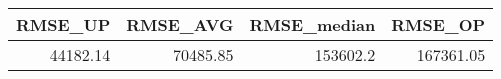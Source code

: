 \begin{tabular}{rrrr}
\toprule
 RMSE\_UP &  RMSE\_AVG &  RMSE\_median &   RMSE\_OP \\
\midrule
44182.14 &  70485.85 &     153602.2 & 167361.05 \\
\bottomrule
\end{tabular}

